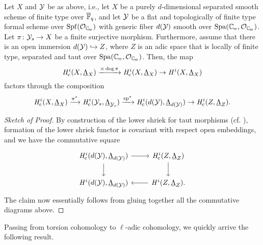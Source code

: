 \documentclass[../main.tex]{subfiles}
\begin{document}
\begin{prop}\label{thm:SubspaceInjectionFiniteLevel}
  Let $X$ and $\mathcal{Y}$ be as above, i.e., let $X$ be a purely $d$-dimensional
  separated smooth scheme of finite type over ${\overline {\mathbb{F}}_q}$, and let 
  $\mathcal{Y}$ be a flat and topologically of finite type formal scheme over
  $\Spf(\cO_\Cp)$ with generic fiber $d(\mathcal{Y})$ smooth over $\spa(\Cp,\cO_\Cp)$.
  Let $\pi\colon \mathcal{Y}_s \to X$ be a finite surjective morphism.
  Furthermore, assume that there is an open immersion
  $d(\mathcal{Y}) \hookrightarrow Z$, where
  $Z$ is an adic space that is locally of finite type, separated and taut
  over $\spa(\Cp, \cO_\Cp)$.
  Then, the map 
  \begin{equation*}
    \mathit H_{\mathrm{c}}^i(X, \underline \Lambda_X) \xrightarrow{\times \deg \pi} 
    \mathit H_{\mathrm{c}}^i(X, \underline \Lambda_X) \to 
    \mathit H^i(X,   \underline \Lambda_X)
  \end{equation*}
  factors through the composition
  \begin{equation*}
    \mathit H_{\mathrm{c}}^i(X,      \underline \Lambda_X) \xrightarrow{\pi^*}
    \mathit H_{\mathrm{c}}^i(\mathcal{Y}_s,  \underline \Lambda_{\mathcal{Y}_s}) \xrightarrow{\mathrm{sp}^*}
    \mathit H_{\mathrm{c}}^i(d(\mathcal{Y}), \underline \Lambda_{d(\mathcal{Y})}) \to 
    \mathit H_{\mathrm{c}}^i(Z,      \underline \Lambda_Z).
  \end{equation*}
\begin{proof}[Sketch of Proof]
  By construction of the lower shriek for taut morphisms (cf. \cite[§0.4
  D)]{huber2013etale}), formation of the lower shriek functor is covariant with
  respect open embeddings, and we have the commutative square
  \begin{equation*}
    \begin{tikzcd}[ampersand replacement=\&]
      {\hHc^i(d(\cY), \underline \Lambda_{d(\cY)})} \& 
      {\hHc^i(Z, \underline \Lambda_{Z})} \\
    	{\hH^i(d(\cY), \underline \Lambda_{d(\cY)})} \& 
      {\hH^i(Z, \underline \Lambda_{Z})}.
    	\arrow[from=1-1, to=1-2]
    	\arrow[from=1-1, to=2-1]
    	\arrow[from=1-2, to=2-2]
    	\arrow[from=2-2, to=2-1]
    \end{tikzcd}
  \end{equation*}
  The claim now essentially follows from gluing together all the commutative
  diagrams above. 
\end{proof}
\end{prop}

Passing from torsion cohomology to $\ell$-adic cohomology, we quickly arrive
the following result.
\end{document}
